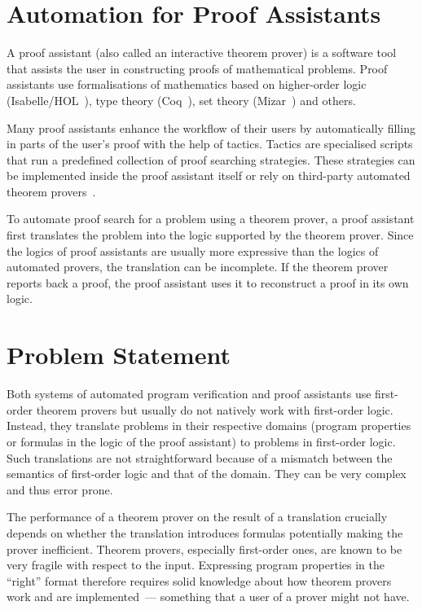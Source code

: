 \section*{Automation for Proof Assistants}
\label{sect:intro:itp}
A proof assistant (also called an interactive theorem prover) is a software tool that assists the user in constructing proofs of mathematical problems. Proof assistants use formalisations of mathematics based on higher-order logic (Isabelle/HOL~\cite{Isabelle}), type theory (Coq~\cite{Coq}), set theory (Mizar~\cite{Mizar}) and others.

Many proof assistants enhance the workflow of their users by automatically filling in parts of the user's proof with the help of tactics. Tactics are specialised scripts that run a predefined collection of proof searching strategies. These strategies can be implemented inside the proof assistant itself or rely on third-party automated theorem provers~\cite{Sledgehammer,DBLP:conf/icms/UrbanHV10}.

To automate proof search for a problem using a theorem prover, a proof assistant first translates the problem into the logic supported by the theorem prover. Since the logics of proof assistants are usually more expressive than the logics of automated provers, the translation can be incomplete. If the theorem prover reports back a proof, the proof assistant uses it to reconstruct a proof in its own logic.

\section*{Problem Statement}
\label{sect:intro:problem}
Both systems of automated program verification and proof assistants use first-order theorem provers but usually do not natively work with first-order logic. Instead, they translate problems in their respective domains (program properties or formulas in the logic of the proof assistant) to problems in first-order logic. Such translations are not straightforward because of a mismatch between the semantics of first-order logic and that of the domain. They can be very complex and thus error prone.

The performance of a theorem prover on the result of a translation crucially depends on whether the translation introduces formulas potentially making the prover inefficient. Theorem provers, especially first-order ones, are known to be very fragile with respect to the input. Expressing program properties in the ``right'' format therefore requires solid knowledge about how theorem provers work and are implemented~--- something that a user of a prover might not have. 


